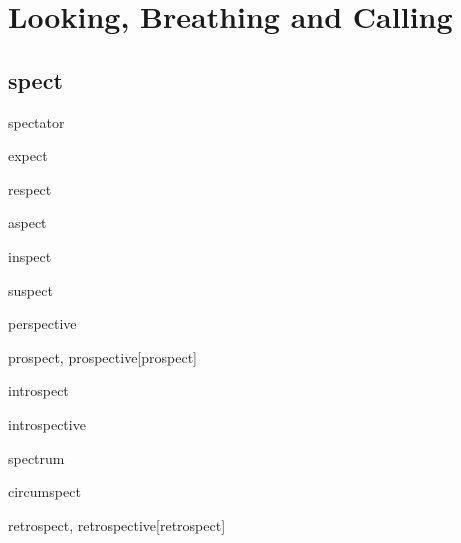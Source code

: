 \chapter{Looking, Breathing and Calling}

\section{spect}

\begin{RefWord}{spectator}
\end{RefWord}

\begin{RefWord}{expect}
\end{RefWord}

\begin{RefWord}{respect}
\end{RefWord}

\begin{RefWord}{aspect}
\end{RefWord}

\begin{RefWord}{inspect}
\end{RefWord}

\begin{RefWord}{suspect}
\end{RefWord}

\begin{RefWord}{perspective}
\end{RefWord}

\begin{RefWord}{prospect, prospective}[prospect]
\end{RefWord}

\begin{RefWord}{introspect}
\end{RefWord}

\begin{RefWord}{introspective}
\end{RefWord}

\begin{RefWord}{spectrum}
\end{RefWord}

\begin{RefWord}{circumspect}
\end{RefWord}

\begin{RefWord}{retrospect, retrospective}[retrospect]
\end{RefWord}

